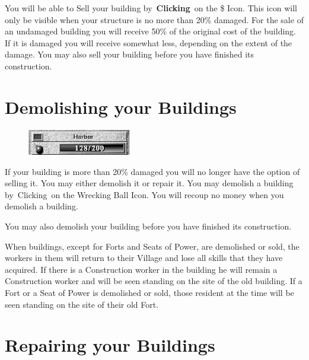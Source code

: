 You will be able to Sell your building by \textbf{Clicking} on the \$ Icon. This icon will only be visible when your structure is no more than 20\% damaged. For the sale of an undamaged building you will receive 50\% of the original cost of the building. If it is damaged you will receive somewhat less, depending on the extent of the damage. You may also sell your building before you have finished its construction.

\section{Demolishing your Buildings}

	
\begin{figure}
	\vspace{-20pt}
	\begin{center}
		\includegraphics[width=0.4\textwidth]{Idamage}
	\end{center}
	\vspace{-20pt}
\end{figure}

If your building is more than 20\% damaged you will no longer have the option of selling it. You may either demolish it or repair it. You may demolish a building by Clicking on the Wrecking Ball Icon. You will recoup no money when you demolish a building.

You may also demolish your building before you have finished its construction.

When buildings, except for Forts and Seats of Power, are demolished or sold, the workers in them will return to their Village and lose all skills that they have acquired. If there is a Construction worker in the building he will remain a Construction worker and will be seen standing on the site of the old building.
If a Fort or a Seat of Power is demolished or sold, those resident at the time will be seen standing on the site of their old Fort.

\section{Repairing your Buildings}

	
